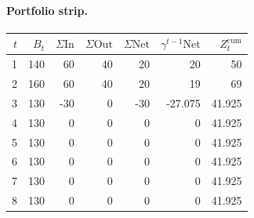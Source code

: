 \documentclass[12pt, a4paper]{article}
\begin{document}
\paragraph{Portfolio strip.}
\begin{center}
\begin{tabular}{rrrrrrr}
\toprule
$t$ & $B_t$ & $\Sigma\mathrm{In}$ & $\Sigma\mathrm{Out}$ & $\Sigma\mathrm{Net}$ & $\gamma^{t-1}\mathrm{Net}$ & $Z_t^{\mathrm{cum}}$\\
\midrule
1 & 140 & 60 & 40 & 20 & 20 & 50 \\
2 & 160 & 60 & 40 & 20 & 19 & 69 \\
3 & 130 & -30 & 0 & -30 & -27.075 & 41.925 \\
4 & 130 & 0 & 0 & 0 & 0 & 41.925 \\
5 & 130 & 0 & 0 & 0 & 0 & 41.925 \\
6 & 130 & 0 & 0 & 0 & 0 & 41.925 \\
7 & 130 & 0 & 0 & 0 & 0 & 41.925 \\
8 & 130 & 0 & 0 & 0 & 0 & 41.925 \\
\bottomrule
\end{tabular}
\end{center}
\end{document}
